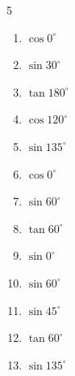 \begin{multicols}{5}
\begin{enumerate}
  \item $\displaystyle \cos{0^\circ}$

        \phantom{$\displaystyle =1$}

  \item $\displaystyle \sin{30^\circ}$


  \item $\displaystyle \tan{180^\circ}$

        \phantom{$\displaystyle =0$}

  \item $\displaystyle \cos{120^\circ}$


  \item $\displaystyle \sin{135^\circ}$


\columnbreak %

  \item $\displaystyle \cos{0^\circ}$

        \phantom{$\displaystyle =1$}

  \item $\displaystyle \sin{60^\circ}$


  \item $\displaystyle \tan{60^\circ}$


  \item $\displaystyle \sin{0^\circ}$

        \phantom{$\displaystyle =0$}

  \item $\displaystyle \sin{60^\circ}$


  \item $\displaystyle \sin{45^\circ}$


  \item $\displaystyle \tan{60^\circ}$


  \item $\displaystyle \sin{135^\circ}$


\end{enumerate}
\end{multicols}
